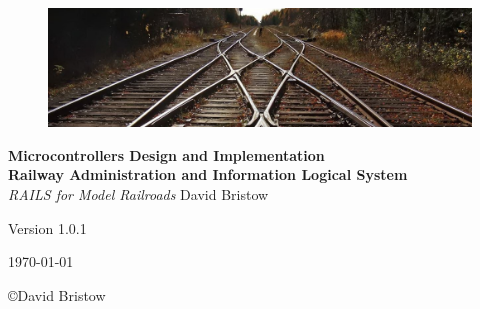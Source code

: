 \documentclass[letterpaper, oneside, 11pt]{book}
\begin{document}
\begin{titlepage}
	\raggedleft
	\begin{figure}[H]
	\centering
		\includegraphics[scale=1.53]{railway_track.jpg}
	\label{fig:track}
\end{figure}
	\vspace*{0.167\textheight}
	\textbf{\LARGE Microcontrollers Design and Implementation}\\[\baselineskip]
    \textbf{\textcolor{MyBlue}{\Huge R\Large ailway \Huge A\Large dministration and \Huge I\Large nformation \Huge L\Large ogical \Huge S\Large ystem}}\\[\baselineskip]
	{\Large \textit{RAILS for Model Railroads}}
	\vfill
    \vspace*{\baselineskip}
	{\small David Bristow}

	{\small Version 1.0.1}
	
	{\small \today}
	\vspace*{3\baselineskip}
\end{titlepage}
\tableofcontents
\copyright David Bristow\\



\backmatter

\printnoidxglossary[sort=letter]
\end{document}
